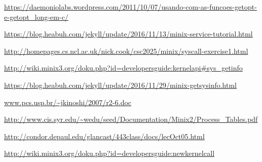 \documentclass[12pt,journal,compsoc]{IEEEtran}
\begin{document}
\renewcommand\refname{Referências}
\begin{thebibliography}{1}

\url{https://daemoniolabs.wordpress.com/2011/10/07/usando-com-as-funcoes-getopt-e-getopt_long-em-c/}

\url{https://blog.heabuh.com/jekyll/update/2016/11/13/minix-service-tutorial.html}

\url{http://homepages.cs.ncl.ac.uk/nick.cook/csc2025/minix/syscall-exercise1.html}

\url{http://wiki.minix3.org/doku.php?id=developersguide:kernelapi#sys_getinfo}

\url{https://blog.heabuh.com/jekyll/update/2016/11/29/minix-getsysinfo.html}

\url{www.pcs.usp.br/~jkinoshi/2007/r2-6.doc}

\url{http://www.cis.syr.edu/~wedu/seed/Documentation/Minix2/Process_Tables.pdf}

\url{http://condor.depaul.edu/glancast/443class/docs/lecOct05.html}

\url{http://wiki.minix3.org/doku.php?id=developersguide:newkernelcall}

\end{thebibliography}
\end{document}
